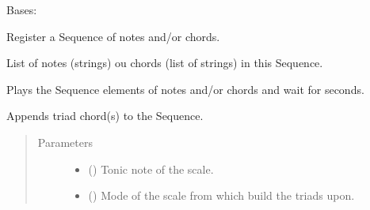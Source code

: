 \documentclass[letterpaper,10pt,english]{sphinxmanual}
\begin{document}
\begin{fulllineitems}
\label{\detokenize{index:birdears.sequence.Sequence}}
Bases: 

Register a Sequence of notes and/or chords.

\begin{fulllineitems}
\label{\detokenize{index:birdears.sequence.Sequence.elements}}
 \textendash{} List of notes (strings) ou chords (list of
strings) in this Sequence.

\end{fulllineitems}


\begin{fulllineitems}
\label{\detokenize{index:birdears.sequence.Sequence.async_play}}
Plays the Sequence elements of notes and/or chords and wait for
 seconds.

\end{fulllineitems}


\begin{fulllineitems}
\label{\detokenize{index:birdears.sequence.Sequence.make_chord_progression}}
Appends triad chord(s) to the Sequence.
\begin{quote}\begin{description}
\item[{Parameters}] \leavevmode\begin{itemize}
\item {} 
 () \textendash{} Tonic note of the scale.

\item {} 
 () \textendash{} Mode of the scale from which build the triads upon.


\end{itemize}
\end{description}
\end{quote}
\end{fulllineitems}
\end{fulllineitems}
\end{document}
